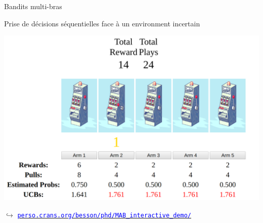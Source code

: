 \documentclass[11pt,english,ignorenonframetext,]{beamer}
\begin{document}
\begin{frame}{Bandits multi-bras}

  Prise de décisions séquentielles face à un environment incertain

  \centering
  \includegraphics[height=0.65\textheight]{figures/example_of_a_5_arm_bandit_problem.png}

  {\tiny
      $\hookrightarrow$ \href{https://perso.crans.org/besson/phd/MAB_interactive_demo/}{\textcolor{blue}{\texttt{perso.crans.org/besson/phd/MAB\_interactive\_demo/}}}
  }

\end{frame}






\end{document}
